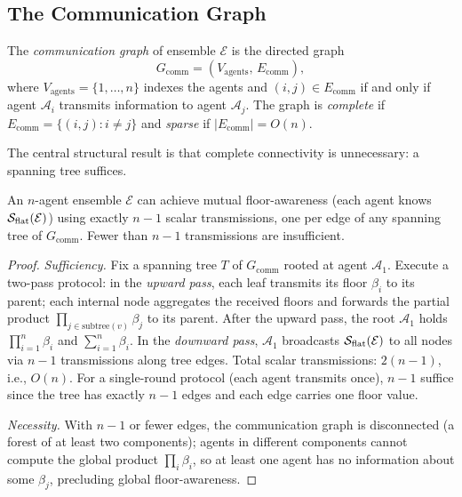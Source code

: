 \subsection{The Communication Graph}

\begin{definition}
\label{def:ch02b-comm-graph}
The \emph{communication graph} of ensemble $\mathcal{E}$ is the directed graph
\begin{equation}
  G_{\mathrm{comm}} = (V_{\mathrm{agents}},\, E_{\mathrm{comm}}),
  \label{eq:ch02b-comm-graph}
\end{equation}
where $V_{\mathrm{agents}} = \{1, \ldots, n\}$ indexes the agents and
$(i, j) \in E_{\mathrm{comm}}$ if and only if agent $\mathcal{A}_i$
transmits information to agent $\mathcal{A}_j$.  The graph is \emph{complete}
if $E_{\mathrm{comm}} = \{(i,j) : i \neq j\}$ and \emph{sparse} if
$|E_{\mathrm{comm}}| = O(n)$.
\end{definition}

The central structural result is that complete connectivity is unnecessary:
a spanning tree suffices.

\begin{theorem}
\label{thm:ch02b-tree-sufficiency}
An $n$-agent ensemble $\mathcal{E}$ can achieve mutual floor-awareness (each
agent knows $\mathcal{S}_{\mathrm{flat}}(\mathcal{E})$) using exactly $n-1$ scalar
transmissions, one per edge of any spanning tree of $G_{\mathrm{comm}}$.
Fewer than $n-1$ transmissions are insufficient.
\end{theorem}

\begin{proof}
\textit{Sufficiency.}  Fix a spanning tree $T$ of $G_{\mathrm{comm}}$ rooted
at agent $\mathcal{A}_1$.  Execute a two-pass protocol: in the \emph{upward
pass}, each leaf transmits its floor $\beta_i$ to its parent; each internal
node aggregates the received floors and forwards the partial product $\prod_{j
\in \mathrm{subtree}(v)} \beta_j$ to its parent.  After the upward pass, the
root $\mathcal{A}_1$ holds $\prod_{i=1}^n \beta_i$ and $\sum_{i=1}^n \beta_i$.
In the \emph{downward pass}, $\mathcal{A}_1$ broadcasts
$\mathcal{S}_{\mathrm{flat}}(\mathcal{E})$ to all nodes via $n-1$ transmissions
along tree edges.  Total scalar transmissions: $2(n-1)$, i.e., $O(n)$.  For a
single-round protocol (each agent transmits once), $n-1$ suffice since the tree
has exactly $n-1$ edges and each edge carries one floor value.

\textit{Necessity.}  With $n-1$ or fewer edges, the communication graph is
disconnected (a forest of at least two components); agents in different
components cannot compute the global product $\prod_i \beta_i$, so at least
one agent has no information about some $\beta_j$, precluding global
floor-awareness.
\end{proof}

